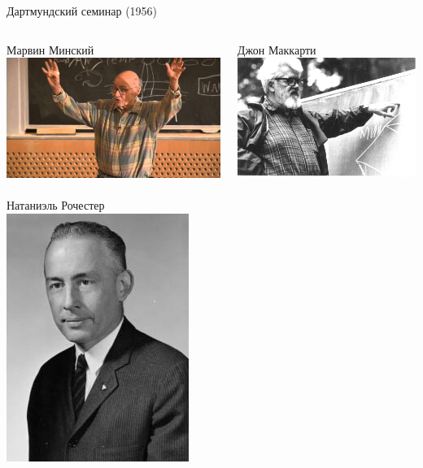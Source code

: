 \documentclass[notes,12pt, aspectratio=169]{beamer}
\begin{document}
\begin{frame}{Дартмундский семинар (1956)}
\begin{columns}[T] %
	\begin{column}{.48\textwidth}
		\centering \color{blue} Марвин Минский
		 \includegraphics[scale=0.1]{minski.jpg}\\
		 \mbox{ } \\
		 \color{blue} Натаниэль Рочестер \\
		 \includegraphics[scale=0.33]{rochester.jpeg}\\
	\end{column}%
	\hfill%
	\begin{column}{.48\textwidth}
		\centering 		 \color{blue} Джон Маккарти
		\includegraphics[scale=0.14]{makart.png}\\

\end{column}
\end{columns}
\end{frame}
\end{document}
